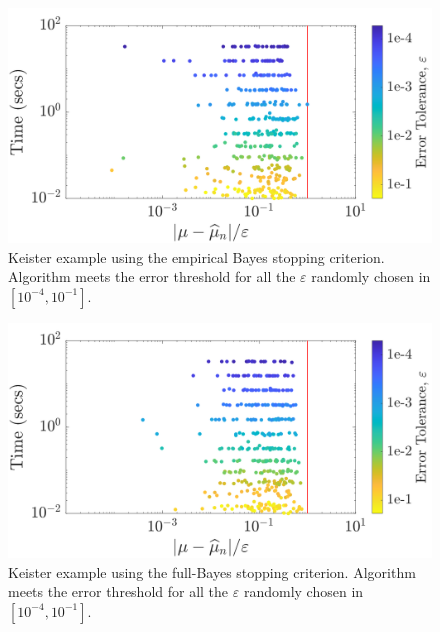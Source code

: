 \documentclass[graybox,footinfo]{svmult}
\begin{document}
\begin{figure}
\centering
\includegraphics[width=0.95\linewidth]{"figures/Sobol/Sobol_Keister_guaranteed_time_MLE__d4_r1_2019-Sep-1"}
\caption[Sobol: Keister guaranteed:EB]{Keister example using the empirical Bayes stopping criterion. Algorithm meets the error threshold for all the $\varepsilon$ randomly chosen in $[10^{-4}, 10^{-1}]$.}
\label{FJ:fig:Sobol-keister-guaranteed-EB}
\end{figure}
\begin{figure}
\centering
\includegraphics[width=0.95\linewidth]{"figures/Sobol/Sobol_Keister_guaranteed_time_full__d4_r1_2019-Sep-1"}
\caption[Sobol: Keister guaranteed: Full Bayes]{Keister example using the full-Bayes stopping criterion. Algorithm meets the error threshold for all the $\varepsilon$ randomly chosen in $[10^{-4}, 10^{-1}]$.}
\label{FJ:fig:Sobol-keister-guaranteed-FB}
\end{figure}
\end{document}
